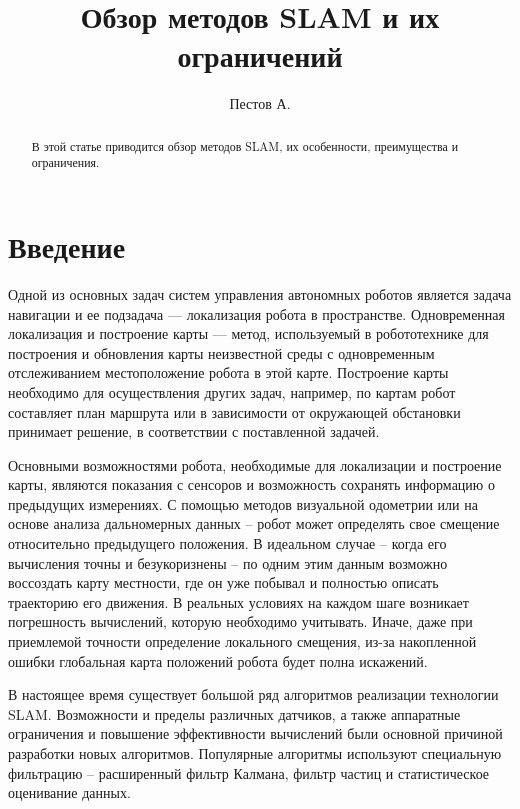

\raggedbottom
%


\title{Обзор методов SLAM и их ограничений}
\author{Пестов А.}
\maketitle

\begin{abstract}
	В этой статье приводится обзор методов SLAM, их особенности, преимущества и ограничения. 
\end{abstract}

\section{Введение}
Одной из основных задач систем управления автономных роботов является задача навигации и ее подзадача —  локализация робота в пространстве. Одновременная локализация и построение карты — метод, используемый в робототехнике для построения и обновления карты неизвестной среды с одновременным отслеживанием местоположение робота в этой карте. Построение карты необходимо для осуществления других задач, например, по картам робот составляет план маршрута или в зависимости от окружающей обстановки принимает решение, в соответствии с поставленной задачей.

Основными возможностями робота, необходимые для локализации и построение карты, являются показания с сенсоров и возможность сохранять информацию о предыдущих измерениях. С помощью методов визуальной одометрии или на основе анализа дальномерных данных – робот может определять свое смещение относительно предыдущего положения. В идеальном случае – когда его вычисления точны и безукоризнены – по одним этим данным возможно воссоздать карту местности, где он уже побывал и полностью описать траекторию его движения. В реальных условиях на каждом шаге возникает погрешность вычислений, которую необходимо учитывать. Иначе, даже при приемлемой точности определение локального смещения, из-за накопленной ошибки глобальная карта положений робота будет полна искажений. 

В настоящее время существует большой ряд алгоритмов реализации технологии SLAM. Возможности и пределы различных датчиков, а также аппаратные ограничения и повышение эффективности вычислений были основной причиной разработки новых алгоритмов. Популярные алгоритмы используют специальную фильтрацию – расширенный фильтр Калмана, фильтр частиц и статистическое оценивание данных. 

